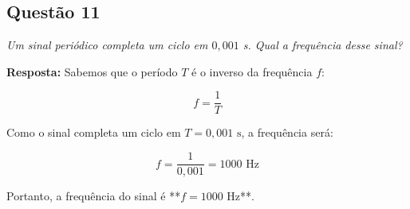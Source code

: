 \subsection*{Questão 11}

\textit{Um sinal periódico completa um ciclo em \(0,001\) s. Qual a frequência desse sinal?}\par

\textbf{Resposta: }  
Sabemos que o período \(T\) é o inverso da frequência \(f\):

\[
f = \frac{1}{T}
\]

Como o sinal completa um ciclo em \(T = 0,001 \text{ s}\), a frequência será:

\[
f = \frac{1}{0,001} = 1000 \text{ Hz}
\]

Portanto, a frequência do sinal é **\(f = 1000\) Hz**.